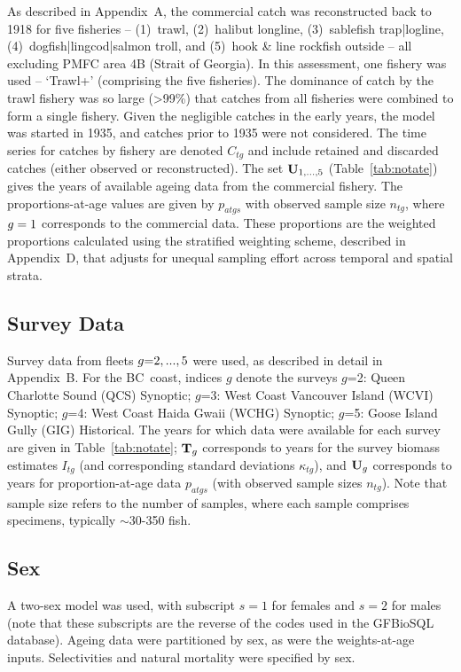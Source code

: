 \documentclass[11pt]{book}
\newcommand{\pc}{\%}
\newcommand{\AppCat}{Appendix~A}
\newcommand{\AppSurv}{Appendix~B}
\newcommand{\AppBio}{Appendix~D}
\begin{document}
As described in \AppCat, the commercial catch was reconstructed back to 1918 for five fisheries -- (1)~trawl, (2)~halibut longline, (3)~sablefish trap|logline, (4)~dogfish|lingcod|salmon troll, and (5)~hook \& line rockfish outside -- all excluding PMFC area 4B (Strait of Georgia).
In this assessment, one fishery was used -- `Trawl+' (comprising the five fisheries).
The dominance of catch by the trawl fishery was so large (>99\pc) that catches from all fisheries were combined to form a single fishery.
Given the negligible catches in the early years, the model was started in 1935, and catches prior to 1935 were not considered.
The time series for catches by fishery are denoted $C_{tg}$ and include retained and discarded catches (either observed or reconstructed). 
The set ${\bf U}_{1,...,5}$ (Table~\ref{tab:notate}) gives the years of available ageing data from the commercial fishery.
The proportions-at-age values are given by $p_{atgs}$ with observed sample size $n_{tg}$, where $g=1$ corresponds to the commercial data.
These proportions are the weighted proportions calculated using the stratified weighting scheme, described in \AppBio, that adjusts for unequal sampling effort across temporal and spatial strata.

\subsection{Survey Data} 
Survey data from fleets $g{=}2,...,5$ were used, as described in detail in \AppSurv{}.
For the BC~coast, indices $g$ denote the surveys  $g$=2: Queen Charlotte Sound (QCS) Synoptic;  $g$=3: West Coast Vancouver Island (WCVI) Synoptic;  $g$=4: West Coast Haida Gwaii (WCHG) Synoptic;  $g$=5: Goose Island Gully (GIG) Historical.
The years for which data were available for each survey are given in Table~\ref{tab:notate};
${\bf T}_g$ corresponds to years for the survey biomass estimates $I_{tg}$ (and corresponding standard deviations $\kappa_{tg}$), and ${\bf U}_g$ corresponds to years for proportion-at-age data $p_{atgs}$ (with observed sample sizes $n_{tg}$).
Note that sample size refers to the number of samples, where each sample comprises specimens, typically $\sim$30-350 fish.

\subsection{Sex}

A two-sex model was used, with subscript $s{=}1$ for females and $s{=}2$ for males (note that these subscripts are the reverse of the codes used in the GFBioSQL database). 
Ageing data were partitioned by sex, as were the weights-at-age inputs. 
Selectivities and natural mortality were specified by sex.
\end{document}
